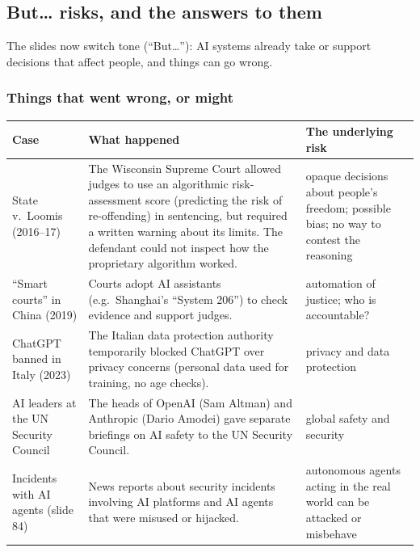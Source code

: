 \subsection{But\ldots{} risks, and the answers to them}
\label{sec:risks-and-regulation}

The slides now switch tone (``But\ldots''): AI systems already take or support decisions
that affect people, and things can go wrong.

\subsubsection{Things that went wrong, or might}

\begin{center}
\small
\begin{tabularx}{\linewidth}{@{}l >{\raggedright\arraybackslash}X >{\raggedright\arraybackslash}X@{}}
\toprule
\textbf{Case} & \textbf{What happened} & \textbf{The underlying risk} \\
\midrule
State v.\ Loomis (2016--17) & The Wisconsin Supreme Court allowed judges to use an
  algorithmic risk-assessment score (predicting the risk of re-offending) in sentencing,
  but required a written warning about its limits. The defendant could not inspect how the
  proprietary algorithm worked. & opaque decisions about people's freedom; possible bias;
  no way to contest the reasoning \\
``Smart courts'' in China (2019) & Courts adopt AI assistants (e.g.\ Shanghai's
  ``System 206'') to check evidence and support judges. & automation of justice; who is
  accountable? \\
ChatGPT banned in Italy (2023) & The Italian data protection authority temporarily
  blocked ChatGPT over privacy concerns (personal data used for training, no age checks). &
  privacy and data protection \\
AI leaders at the UN Security Council & The heads of OpenAI (Sam Altman) and Anthropic
  (Dario Amodei) gave separate briefings on AI safety to the UN Security Council. &
  global safety and security \\
Incidents with AI agents (slide 84) & News reports about security incidents involving AI
  platforms and AI agents that were misused or hijacked. & autonomous agents acting in the
  real world can be attacked or misbehave \\
\bottomrule
\end{tabularx}
\end{center}

